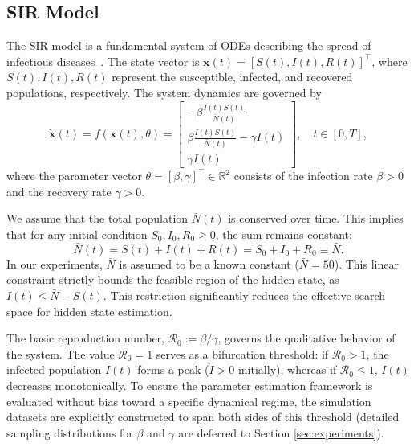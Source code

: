 \subsection{SIR Model}
\label{subsec:sir}

The SIR model is a fundamental system of ODEs describing the spread of infectious diseases~\cite{kermack1927contribution}. 
The state vector is $\mathbf{x}(t) = [S(t), I(t), R(t)]^\top$, where $S(t), I(t), R(t)$ represent the susceptible, infected, and recovered populations, respectively. 
The system dynamics are governed by
\begin{equation}
\label{eq:sir}
    \dot{\mathbf{x}}(t) = f(\mathbf{x}(t), \theta) = 
    \begin{bmatrix}
        -\beta \frac{I(t)S(t)}{\bar{N}(t)} \\[6pt]
        \beta \frac{I(t)S(t)}{\bar{N}(t)} - \gamma I(t) \\[6pt]
        \gamma I(t)
    \end{bmatrix},
    \quad t \in [0, T],
\end{equation}
where the parameter vector $\theta = [\beta, \gamma]^\top \in \mathbb{R}^2$ consists of the infection rate $\beta > 0$ and the recovery rate $\gamma > 0$. 

We assume that the total population $\bar{N}(t)$ is conserved over time. 
This implies that for any initial condition $S_0, I_0, R_0 \ge 0$, the sum remains constant:
\begin{equation}
\label{eq:sir_conserve}
    \bar{N}(t) = S(t) + I(t) + R(t) = S_0 + I_0 + R_0 \equiv \bar{N}.
\end{equation}
In our experiments, $\bar{N}$ is assumed to be a known constant ($\bar{N}=50$).
This linear constraint strictly bounds the feasible region of the hidden state, as $I(t) \leq \bar{N}-S(t)$.
This restriction significantly reduces the effective search space for hidden state estimation.

The basic reproduction number, $\mathcal{R}_0 := \beta / \gamma$, governs the qualitative behavior of the system. 
The value $\mathcal{R}_0 = 1$ serves as a bifurcation threshold: if $\mathcal{R}_0 > 1$, the infected population $I(t)$ forms a peak ($\dot{I} > 0$ initially), whereas if $\mathcal{R}_0 \le 1$, $I(t)$ decreases monotonically. 
To ensure the parameter estimation framework is evaluated without bias toward a specific dynamical regime, the simulation datasets are explicitly constructed to span both sides of this threshold (detailed sampling distributions for $\beta$ and $\gamma$ are deferred to Section \ref{sec:experiments}).

